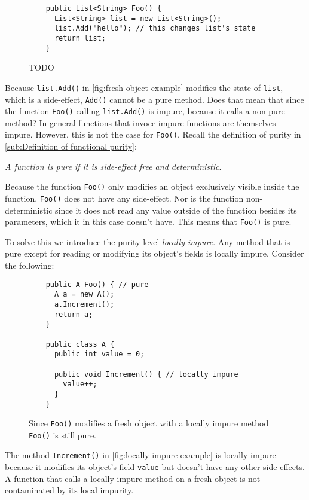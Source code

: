 \documentclass[a4paper,12pt]{article}
\begin{document}
\begin{figure}[H]
  \centering
  \begin{lstlisting}
    public List<String> Foo() {
      List<String> list = new List<String>();
      list.Add("hello"); // this changes list's state
      return list;
    }
  \end{lstlisting}
  \caption{TODO}
  \label{fig:fresh-object-example}
\end{figure}

Because \texttt{list.Add()} in \autoref{fig:fresh-object-example} modifies the state of \texttt{list}, which is a side-effect, \texttt{Add()} cannot be a pure method. Does that mean that since the function \texttt{Foo()} calling \texttt{list.Add()} is impure, because it calls a non-pure method? In general functions that invoce impure functions are themselves impure. However, this is not the case for \texttt{Foo()}. Recall the definition of purity in \autoref{sub:Definition of functional purity}:

\textit{A function is pure if it is side-effect free and deterministic}.

Because the function \texttt{Foo()} only modifies an object exclusively visible inside the function, \texttt{Foo()} does not have any side-effect. Nor is the function non-deterministic since it does not read any value outside of the function besides its parameters, which it in this case doesn't have. This means that \texttt{Foo()} is pure.

To solve this we introduce the purity level \textit{locally impure}. Any method that is pure except for reading or modifying its object's fields is locally impure. Consider the following:

\begin{figure}[H]
  \centering
  \begin{lstlisting}
    public A Foo() { // pure
      A a = new A();
      a.Increment();
      return a;
    }

    public class A {
      public int value = 0;

      public void Increment() { // locally impure
        value++;
      }
    }
  \end{lstlisting}
  \caption{Since \texttt{Foo()} modifies a fresh object with a locally impure method \texttt{Foo()} is still pure.}
  \label{fig:locally-impure-example}
\end{figure}

The method \texttt{Increment()} in \autoref{fig:locally-impure-example} is locally impure because it modifies its object's field \texttt{value} but doesn't have any other side-effects. A function that calls a locally impure method on a fresh object is not contaminated by its local impurity.
\end{document}

